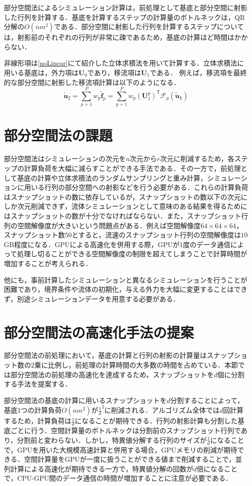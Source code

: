 \documentclass[a4j,12pt]{jreport}
\begin{document}
部分空間法によるシミュレーション計算は，前処理として基底と部分空間に射影した行列を計算する．基底を計算するステップの計算量のボトルネックは，QR分解の$O(nm^2)$である．部分空間に射影した行列を計算するステップについては，射影前のそれぞれの行列が非常に疎であるため，基底の計算ほど時間はかからない．

非線形項は\ref{noLinear}にて紹介した立体求積法を用いて計算する．立体求積法に用いる基底は，外力項は$\bm{U}_0$であり，移流項は$\bm{U}_1$である．
例えば，移流項を最終的な部分空間に射影した移流項計算は以下のようになる．
\[
	\bm{\widetilde{u}}_2 = \sum_{p=1}^Pw_p\bm{\widetilde{f}}_p =   \sum_{p=1}^Pw_p(\bm{U}^p_1)^{\mathsf T}\mathcal{F}_p(\bm{\widetilde{u}_1})
\]

\section{部分空間法の課題}
部分空間法はシミュレーションの次元を$n$次元から$r$次元に削減するため，各ステップの計算負荷を大幅に減らすことができる手法である．その一方で，前処理として基底の計算や立体求積法のランダムサンプリングと重み計算，シミュレーションに用いる行列の部分空間への射影などを行う必要がある．これらの計算負荷はスナップショットの数に依存しているが，スナップショットの数以下の次元にしか次元削減できず，流体シミュレーションとして意味のある結果を得るためにはスナップショットの数が十分でなければならない．また，スナップショット行列の空間解像度が大きいという問題点がある．例えば空間解像度$64\times64\times64$，スナップショット数$50$とすると，流速のスナップショット行列の空間解像度は$10$GB程度になる．GPUによる高速化を併用する際，GPUが1度のデータ通信によって処理し切ることができる空間解像度の制限を超えてしまうことで計算時間が増加することが考えられる．

他にも，事前計算したシミュレーションと異なるシミュレーションを行うことが困難であり，境界条件や流体の初期化，与える外力を大幅に変更することはできず，別途シミュレーションデータを用意する必要がある．

\section{部分空間法の高速化手法の提案}
部分空間法の前処理において，基底の計算と行列の射影の計算量はスナップショット数の$2$乗に比例し，前処理の計算時間の大多数の時間を占めている．本節では部分空間法の前処理の高速化を達成するため，スナップショットを$d$個に分割する手法を提案する．

部分空間法の基底の計算に用いるスナップショットを$d$分割することによって，基底1つの計算負荷$O(nm^2)$が$\frac{1}{d}^2$に削減される．アルゴリズム全体では$d$回計算するため，計算負荷は$\frac{1}{d}$になることが期待できる．行列の射影計算も分割した基底ごとに行う．空間計算量のボトルネックは分割前のスナップショット行列であり，分割前と変わらない．しかし，特異値分解する行列のサイズが$\frac{1}{d}$になることで，GPUを用いた大規模高速計算と併用する場合，GPUメモリの削減が期待できる．空間計算量をGPUが一度に扱うことができる値まで削減することで，並列計算による高速化が期待できる一方で，特異値分解の回数が$d$倍になることで，CPU-GPU間のデータ通信の時間が増加することに注意が必要である．
\end{document}

